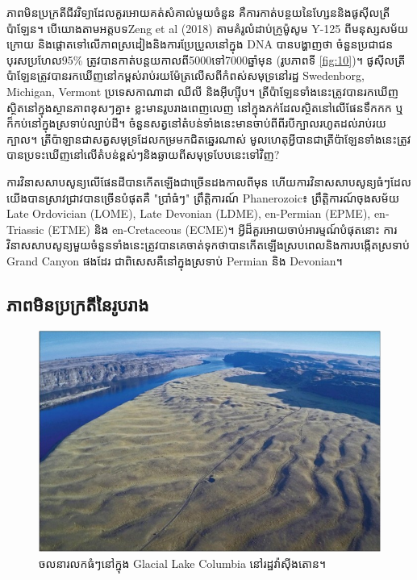 \documentclass[10pt,twocolumn,letterpaper]{article}
\begin{document}
ភាពមិនប្រក្រតីជីវវិទ្យាដែលគួរអោយគត់សំគាល់មួយចំនួន គឺការកាត់បន្ថយនៃហ្សែននិងផូសុីលត្រីប៉ាឡែន។ បើយោងតាមអត្តបទ​Zeng et al (2018) តាមគំរូលំដាប់ក្រូម៉ូសូម Y-125 ពីមនុស្សសម័យក្រោយ និងផ្តោតទៅលើភាពស្រដៀងនិងការប្រែប្រួលនៅក្នុង DNA បានបង្ហាញថា ចំនួនប្រជាជនបុរសប្រហែល95\% ត្រូវបានកាត់បន្តយកាលពី5000ទៅ7000ឆ្នាំមុន (រូបភាពទី \ref{fig:10})\cite{62}។ ផូសុីលត្រីប៉ាឡែនត្រូវបានរកឃើញនៅកម្ពស់រាប់រយម៉ែត្រលើសពីកំពស់សមុទ្រនៅរដ្ឋ Swedenborg, Michigan, Vermont ប្រទេសកាណាដា ឈីលី និងអ៊ីហ្ស៊ីប\cite{63,64,65,66}។ ត្រីប៉ាឡែនទាំងនេះត្រូវបានរកឃើញស្ថិតនៅក្នុងស្ថានភាពខុសៗគ្នា៖ ខ្លះមានរូបរាងពេញលេញ នៅក្នុងភក់ដែលស្ថិតនៅលើផែនទឹកកក ឬក៏កប់នៅក្នុងស្រទាប់ល្បាប់ដី។ ចំនួនសត្វនៅតំបន់ទាំងនេះមានចាប់ពីពីរបីក្បាលរហូតដល់រាប់រយក្បាល។ ត្រីប៉ាឡានជាសត្វសមុទ្រដែលកម្រមកជិតឆ្នេរណាស់ មូលហេតុអ្វីបានជាត្រីប៉ាឡែនទាំងនេះត្រូវបានប្រទះឃើញនៅលើតំបន់ខ្ពស់ៗនិងឆ្ងាយពីសមុទ្របែបនេះទៅវិញ?

ការវិនាសសាបសូន្យលើផែនដីបានកើតឡើងជាច្រើនដងកាលពីមុន ហើយការវិនាសសាបសូន្យធំៗដែលយើងបានស្រាវជ្រាវបានច្រើនបំផុតគឺ "ប្រាំធំៗ" ព្រឹត្តិការណ៍ Phanerozoic៖ ព្រឹត្តិការណ៍ចុងសម័យ Late Ordovician (LOME), Late Devonian (LDME), en-Permian (EPME), en-Triassic (ETME) និង en-Cretaceous (ECME)\cite{88,89}។ អ្វីដ៏គួរអោយចាប់អារម្មណ៍បំផុតនោះ ការវិនាសសាបសូន្យមួយចំនួនទាំងនេះត្រូវបានគេចាត់ទុកថាបានកើតឡើងស្របពេលនិងការបង្កើតស្រទាប់ Grand Canyon ផងដែរ ជាពិសេសគឺនៅក្នុងស្រទាប់ Permian និង Devonian។

\subsection{ភាពមិនប្រក្រតីនៃរូបរាង}

\begin{figure}[b]
\begin{center}
   \includegraphics[width=1\linewidth]{columbia.jpg}
\end{center}
   \caption{ចលនារលកធំៗនៅក្នុង Glacial Lake Columbia នៅរដ្ឋវ៉ាស៊ីងតោន\cite{80}។}
\label{fig:11}
\label{fig:onecol}
\end{figure}
\end{document}
